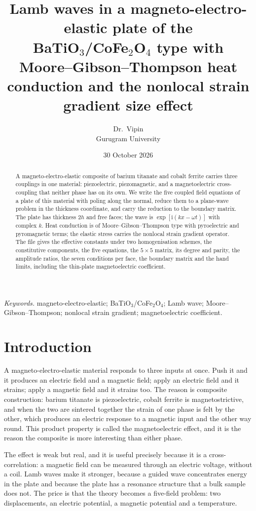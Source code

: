 \documentclass[11pt,a4paper]{article}
\title{\bfseries Lamb waves in a magneto-electro-elastic plate of the\\[2pt]
BaTiO$_3$/CoFe$_2$O$_4$ type with Moore--Gibson--Thompson heat\\[2pt]
conduction and the nonlocal strain gradient size effect}
\author{Dr.\ Vipin\\ Gurugram University}
\date{30 October 2026}
\newcommand{\ii}{\mathrm{i}}
\begin{document}
\maketitle

\begin{abstract}
\noindent
A magneto-electro-elastic composite of barium titanate and cobalt ferrite carries three couplings in one
material: piezoelectric, piezomagnetic, and a magnetoelectric cross-coupling that neither phase has on its
own. We write the five coupled field equations of a plate of this material with poling along the normal,
reduce them to a plane-wave problem in the thickness coordinate, and carry the reduction to the boundary
matrix. The plate has thickness $2h$ and free faces; the wave is $\exp[\ii(kx-\omega t)]$ with complex $k$.
Heat conduction is of Moore--Gibson--Thompson type with pyroelectric and pyromagnetic terms; the elastic
stress carries the nonlocal strain gradient operator. The file gives the effective constants under two
homogenisation schemes, the constitutive components, the five equations, the $5\times5$ matrix, its degree
and parity, the amplitude ratios, the seven conditions per face, the boundary matrix and the hand limits,
including the thin-plate magnetoelectric coefficient.
\end{abstract}

\noindent\textit{Keywords.} magneto-electro-elastic; BaTiO$_3$/CoFe$_2$O$_4$; Lamb wave;
Moore--Gibson--Thompson; nonlocal strain gradient; magnetoelectric coefficient.

\section{Introduction}

A magneto-electro-elastic material responds to three inputs at once. Push it and it produces an electric
field and a magnetic field; apply an electric field and it strains; apply a magnetic field and it strains
too. The reason is composite construction: barium titanate is piezoelectric, cobalt ferrite is
magnetostrictive, and when the two are sintered together the strain of one phase is felt by the other, which
produces an electric response to a magnetic input and the other way round. This product property is called
the magnetoelectric effect, and it is the reason the composite is more interesting than either phase.

The effect is weak but real, and it is useful precisely because it is a cross-correlation: a magnetic field
can be measured through an electric voltage, without a coil. Lamb waves make it stronger, because a guided
wave concentrates energy in the plate and because the plate has a resonance structure that a bulk sample
does not. The price is that the theory becomes a five-field problem: two displacements, an electric
potential, a magnetic potential and a temperature.
\end{document}
